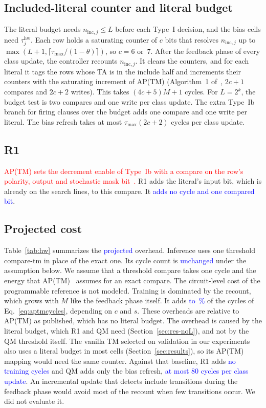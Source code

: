 \documentclass[preprint,12pt,times]{elsarticle}
\newcommand{\proj}[1]{\textcolor{blue}{#1}}
\newcommand{\add}[1]{{\color{blue}#1}}
\newcommand{\maskred}[1]{\textcolor{red}{#1}}
\newcommand{\ninc}{n_{\mathrm{inc},j}}
\begin{document}
\subsection{Included-literal counter and literal budget}
\add{\label{sec:hw-count}}
The literal budget needs $\ninc \le L$ before each Type~I decision, and the bias cells need $\tau_j^{\mathrm{hw}}$.
Each row holds a saturating counter of $c$ bits that resolves $\ninc$ up to $\max(L+1, \lceil \tau_{\max}/(1-\theta) \rceil)$, so $c = 6$ or~7.
After the feedback phase of every class update, the controller recounts $\ninc$.
It clears the counters, and for each literal it tags the rows whose TA is in the include half and increments their counters with the saturating increment of AP(TM) (Algorithm~1 of~\cite{shrot2026aptm}, $2c+1$ compares and $2c+2$ writes).
This takes $(4c+5)M + 1$ cycles.
For $L = 2^k$, the budget test is two compares and one write per class update.
The extra Type~Ib branch for firing clauses over the budget adds one compare and one write per literal.
The bias refresh takes at most $\tau_{\max}(2c+2)$ cycles per class update.

\subsection{R1}
\maskred{AP(TM) sets the decrement enable of Type~Ib with a compare on the row's polarity, output and stochastic mask bit~\cite{shrot2026aptm}.}
R1 adds the literal's input bit, which is already on the search lines, to this compare.
It \proj{adds no cycle and one compared bit}.

\subsection{Projected cost}
\label{sec:hwcost}
Table~\ref{tab:hw} summarizes the \proj{projected} overhead.
Inference uses one threshold compare-tm in place of the exact one.
Its cycle count is \proj{unchanged} under the assumption below.
We assume that a threshold compare takes one cycle and the energy that AP(TM)~\cite{shrot2026aptm} assumes for an exact compare. The circuit-level cost of the programmable reference is not modeled.
Training is dominated by the recount, which grows with $M$ like the feedback phase itself.
It adds \proj{\numhwLmindc{} to \numhwLmaxge{}\,\%} of the cycles of Eq.~\eqref{eq:aptmcycles}, depending on $c$ and $s$.
These overheads are relative to AP(TM) as published, which has no literal budget.
The overhead is caused by the literal budget, which R1 and QM need\add{ (Section~\ref{sec:res-noL})}, and not by the QM threshold itself.
The vanilla TM selected on validation in our experiments also uses a literal budget in most cells (Section~\ref{sec:results}), so its AP(TM) mapping would need the same counter.
Against that baseline, R1 adds \proj{no training cycles} and QM adds only the bias refresh, \proj{at most 80 cycles per class update}.
An incremental update that detects include transitions during the feedback phase would avoid most of the recount when few transitions occur.
We did not evaluate it.
\end{document}
